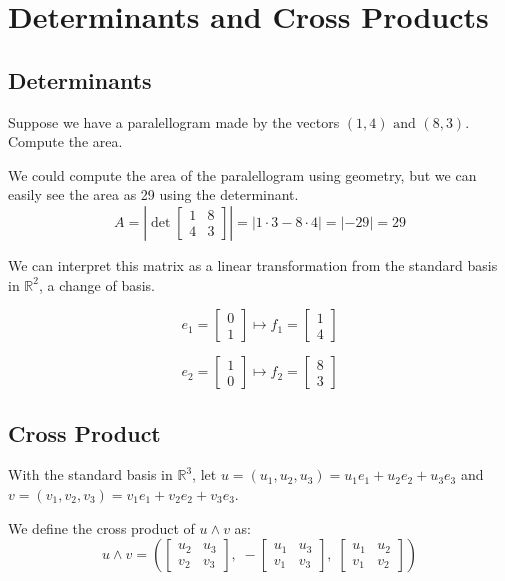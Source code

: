 \documentclass[../main.tex]{subfiles}
\begin{document}
\section{Determinants and Cross Products}

\subsection{Determinants}

\begin{example}
    Suppose we have a paralellogram made by the vectors \( (1,4) \text{ and }  (8,3) \). Compute the area.


    We could compute the area of the paralellogram using geometry, but we can easily see the area as 29 using the determinant.
    \[ A = \left| \det \begin{bmatrix}
        1 & 8 \\
        4 & 3
    \end{bmatrix}\right| = \left|1 \cdot 3 - 8 \cdot 4\right| = \left|-29\right| = 29 \]
\end{example}

We can interpret this matrix as a linear transformation from the standard basis in \( \mathbb{R}^2 \), a change of basis.

\[ e_1 = \begin{bmatrix}
    0 \\ 1
\end{bmatrix} \mapsto f_1 = \begin{bmatrix}
    1 \\ 4
\end{bmatrix} \]

\[ e_2 = \begin{bmatrix}
    1 \\ 0
\end{bmatrix} \mapsto f_2 = \begin{bmatrix}
    8 \\ 3
\end{bmatrix} \]

\subsection{Cross Product}
With the standard basis in \( \mathbb{R}^3 \), let \( u = (u_1, u_2, u_3) = u_1e_1 + u_2e_2 + u_3e_3 \)
and \( v = (v_1, v_2, v_3) = v_1e_1 + v_2e_2 + v_3e_3 \).

We define the cross product of \( u \wedge  v \) as:
\[ u \wedge  v = \left( \begin{bmatrix}
    u_2 & u_3 \\
    v_2 & v_3
\end{bmatrix}, \;  -\begin{bmatrix}
    u_1 & u_3 \\
    v_1 & v_3
\end{bmatrix}, \; \begin{bmatrix}
    u_1 & u_2 \\
    v_1 & v_2
\end{bmatrix} \right) \]
\end{document}
